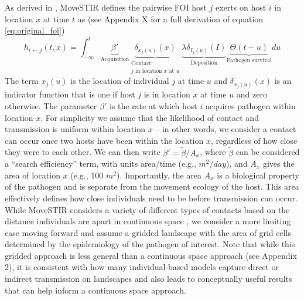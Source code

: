 \documentclass[letterpaper]{article}
\begin{document}
As derived in \cite{Wilber2022}, MoveSTIR defines the pairwise FOI host $j$ exerts on host $i$ in location $x$ at time $t$ as \citep{Wilber2022} (see Appendix X for a full derivation of equation \ref{eq:original_foi})
\begin{equation}
    h_{i \leftarrow j}(t, x) = \int_{-\infty}^{t} \underbrace{\beta'}_{\text{Acquisition}} \underbrace{\delta_{x_j(u)}(x)}_{\substack{\text{Contact:} \\ \text{$j$ in location $x$ at $u$}}}  \underbrace{\lambda \delta_{I_j(u)}(I)}_{\text{Deposition}} \underbrace{\Theta(t - u)}_{\text{Pathogen survival}} du
    \label{eq:original_foi}
\end{equation}
The term $x_j(u)$ is the location of individual $j$ at time $u$ and $\delta_{x_j(u)}(x)$ is an indicator function that is one if host $j$ is in location $x$ at time $u$ and zero otherwise. The parameter $\beta'$ is the rate at which host $i$ acquires pathogen within location $x$. For simplicity we assume that the likelihood of contact and transmission is uniform within location $x$ -- in other words, we consider a contact can occur once two hosts have been within the location $x$, regardless of how close they were to each other. We can then write $\beta'=\tilde{\beta} / A_x$, where $\tilde{\beta}$ can be considered a ``search efficiency'' term, with units area/time (e.g., $m^2 / day$), and $A_x$ gives the area of location $x$ (e.g., 100 $m^2$). %
Importantly, the area $A_x$ is a biological property of the pathogen and is separate from the movement ecology of the host. This area effectively defines how close individuals need to be before transmission can occur. While MoveSTIR considers a variety of different types of contacts based on the distance individuals are apart in continuous space \citep{Wilber2022}, we consider a more limiting case moving forward and assume a gridded landscape with the area of grid cells determined by the epidemiology of the pathogen of interest.  %
Note that while this gridded approach is less general than a continuous space approach (see Appendix 2), it is consistent with how many individual-based models capture direct or indirect transmission on landscapes \citep[e.g.][]{White2018e,Thompson2024} and also leads to conceptually useful results that can help inform a continuous space approach. 
\end{document}
